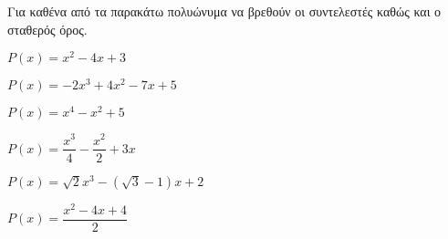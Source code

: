 Για καθένα από τα παρακάτω πολυώνυμα να βρεθούν οι συντελεστές καθώς και ο σταθερός όρος.
\begin{multicols}{2}
\begin{alist}
\item $ P(x)=x^2-4x+3 $
\item $ P(x)=-2x^3+4x^2-7x+5 $
\item $ P(x)=x^4-x^2+5 $
\item $ P(x)=\dfrac{x^3}{4}-\dfrac{x^2}{2}+3x $
\item $ P(x)=\sqrt{2}x^3-(\sqrt{3}-1)x+2 $
\item $ P(x)=\dfrac{x^2-4x+4}{2} $
\end{alist}
\end{multicols}
